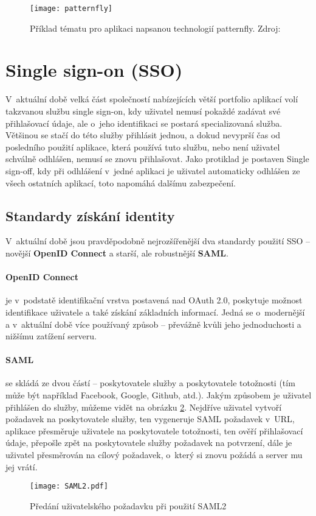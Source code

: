 \begin{itemize}
\begin{figure}[h!]
\centering
\texttt{[image: patternfly]}
\caption[Příklad tématu pro aplikaci napsanou technologií patternfly]{Příklad tématu pro aplikaci napsanou technologií patternfly. Zdroj: \cite{patternfly}}
\label{patternfly-fig}
\end{figure}
\end{itemize}

\section{Single sign-on (SSO)}
\par V~aktuální době velká část společností nabízejících větší portfolio aplikací volí takzvanou službu single sign-on, kdy uživatel nemusí pokaždé zadávat své přihlašovací údaje, ale o~jeho identifikaci se postará specializovaná služba. Většinou se stačí do této služby přihlásit jednou, a dokud nevyprší čas od posledního použití aplikace, která používá tuto službu, nebo není uživatel schválně odhlášen, nemusí se znovu přihlašovat. Jako protiklad je postaven Single sign-off, kdy při odhlášení v~jedné aplikaci je uživatel automaticky odhlášen ze všech ostatních aplikací, toto napomáhá dalšímu zabezpečení.

\subsection{Standardy získání identity}
\par V~aktuální době jsou pravděpodobně nejrozšířenější dva standardy použití SSO -- novější \textbf{OpenID Connect} a starší, ale robustnější \textbf{SAML}.

\paragraph{OpenID Connect} je v~podstatě identifikační vrstva postavená nad OAuth 2.0, poskytuje možnost identifikace uživatele a také získání základních informací. Jedná se o~modernější a v~aktuální době více používaný způsob -- převážně kvůli jeho jednoduchosti a nižšímu zatížení serveru. \cite{oidc}

\paragraph{SAML} se skládá ze dvou částí -- poskytovatele služby a poskytovatele totožnosti (tím může být například Facebook, Google, Github, atd.). Jakým způsobem je uživatel přihlášen do služby, můžeme vidět na obrázku \ref{saml2}. Nejdříve uživatel vytvoří požadavek na poskytovatele služby, ten vygeneruje SAML požadavek v~URL, aplikace přesměruje uživatele na poskytovatele totožnosti, ten ověří přihlašovací údaje, přepošle zpět na poskytovatele služby požadavek na potvrzení, dále je uživatel přesměrován na cílový požadavek, o~který si znovu požádá a server mu jej vrátí. \cite{saml}
\begin{figure}[!htp]
\centering
\texttt{[image: SAML2.pdf]}
\caption{Předání uživatelského požadavku při použití SAML2}
\label{saml2}
\end{figure}

